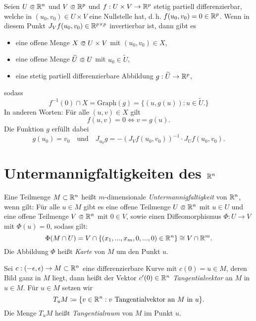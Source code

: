 \documentclass{cheat-sheet}
\begin{document}
\begin{samepage}

\begin{satz}
Seien $U \opn \R^n$ und $V \opn \R^p$ und $f : U \times V \to \mathbb{R}^p$ stetig partiell differenzierbar, welche in $(u_0, v_0) \in U \times V$ eine Nullstelle hat, d.\,h. $f(u_0, v_0) = 0 \in \mathbb{R}^p$. Wenn in diesem Punkt $J_V f(u_0, v_0) \in \mathbb{R}^{p \times p}$ invertierbar ist, dann gibt es
\begin{itemize}
  \item eine offene Menge $X \opn U \times V$ mit $(u_0, v_0) \in X$,
  \item eine offene Menge $\widetilde{U} \opn U$ mit $u_0 \in \widetilde{U}$,
  \item eine stetig partiell differenzierbare Abbildung $g : \widetilde{U} \to \mathbb{R}^p$,
\end{itemize}
sodass
\[ f^{-1}(0) \cap X = \mathrm{Graph}(g) = \{ (u, g(u)) : u \in \widetilde{U}. \} \]
In anderen Worten: Für alle $(u, v) \in X$ gilt
\[ f(u, v) = 0 \iff v = g(u). \]
Die Funktion $g$ erfüllt dabei
\[ g(u_0) = v_0\quad\text{und}\quad J_{u_0} g = - \left(J_V f(u_0, v_0)\right)^{-1} \cdot J_U f(u_0, v_0). \]
\end{satz}


\section{Untermannigfaltigkeiten des $\mathbb{R}^n$}

\end{samepage}

\begin{defn}
Eine Teilmenge $M \subset \mathbb{R}^n$ heißt $m$-dimensionale \emph{Untermannigfaltigkeit} von $\mathbb{R}^n$, wenn gilt: Für alle $u \in M$ gibt es eine offene Teilmenge $U \opn \R^n$ mit $u \in U$ und eine offene Teilmenge $V \opn \R^n$ mit $0 \in V$, sowie einen Diffeomorphismus $\Phi : U \to V$ mit $\Phi(u) = 0$, sodass gilt:
  \[ \Phi(M \cap U) = V \cap \{ (x_1, ..., x_m, 0, ..., 0) \in \mathbb{R}^n \} \cong V \cap \mathbb{R}^m. \]
Die Abbildung $\Phi$ heißt \emph{Karte} von $M$ um den Punkt $u$.
\end{defn}

\begin{defn}
Sei $c : (-\epsilon, \epsilon) \to M \subset \mathbb{R}^n$ eine differenzierbare Kurve mit $c(0) = u \in M$, deren Bild ganz in $M$ liegt, dann heißt der Vektor $c'(0) \in \mathbb{R}^n$ \emph{Tangentialvektor} an $M$ in $u \in M$. Für $u \in M$ setzen wir
\[ T_u M \coloneqq \{ v \in \mathbb{R}^n : v \text{ Tangentialvektor an } M \text{ in } u \}. \]
Die Menge $T_u M$ heißt \emph{Tangentialraum} von $M$ im Punkt $u$.
\end{defn}
\end{document}
